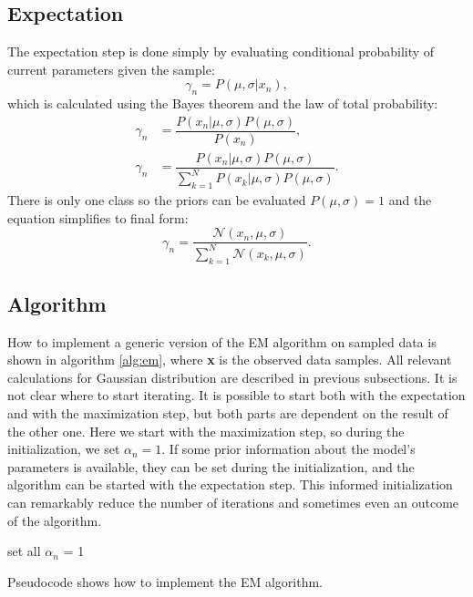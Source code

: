 \subsection{Expectation}
The expectation step is done simply by evaluating conditional probability of current parameters given the sample:
\begin{equation}
\gamma_n = P(\mu, \sigma | x_n),
\end{equation}
which is calculated using the Bayes theorem and the law of total probability:
\begin{align}
\gamma_n &= \dfrac{P(x_n | \mu, \sigma) P(\mu, \sigma)}{P(x_n)}, \nonumber \\
\gamma_n &= \dfrac{P(x_n | \mu, \sigma) P(\mu, \sigma)}{\sum_{k = 1}^N P(x_k | \mu, \sigma) P(\mu, \sigma)}.
\end{align}
There is only one class so the priors can be evaluated $P(\mu, \sigma) = 1$ and the equation simplifies to final form:
\begin{equation}
\gamma_n = \dfrac{\mathcal{N}(x_n, \mu, \sigma) }{\sum_{k = 1}^N \mathcal{N}(x_k, \mu, \sigma) }.
\end{equation}

\subsection{Algorithm}
How to implement a generic version of the EM algorithm on sampled data is shown in algorithm \ref{alg:em}, where \textbf{x} is the observed data samples. All relevant calculations for Gaussian distribution are described in previous subsections. It is not clear where to start iterating. It is possible to start both with the expectation and with the maximization step, but both parts are dependent on the result of the other one. Here we start with the maximization step, so during the initialization, we set $\alpha_n = 1$. If some prior information about the model's parameters is available, they can be set during the initialization, and the algorithm can be started with the expectation step. This informed initialization can remarkably reduce the number of iterations and sometimes even an outcome of the algorithm.
\begin{algorithm}[]
 set all $\alpha_n$ = 1\;
 \caption{Pseudocode shows how to implement the EM algorithm.}
 \label{alg:em}
\end{algorithm}


